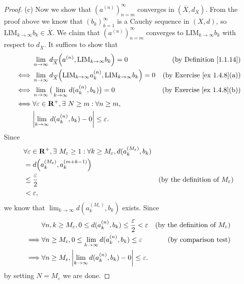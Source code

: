 \begin{proof}{(c)}
    Now we show that \((a^{(n)})_{n = m}^\infty\) converges in \((\overline{X}, d_{\overline{X}})\).
    From the proof above we know that \((b_k)_{k = 1}^\infty\) is a Cauchy sequence in \((X, d)\), so \(\text{LIM}_{k \to \infty} b_k \in \overline{X}\).
    We claim that \((a^{(n)})_{n = m}^\infty\) converges to \(\text{LIM}_{k \to \infty} b_k\) with respect to \(d_{\overline{X}}\).
    It suffices to show that
    \begin{align*}
             & \lim_{n \to \infty} d_{\overline{X}}\Big(a^{(n)}, \text{LIM}_{k \to \infty} b_k\Big) = 0                             & \text{(by Definition \ref{1.1.14})}    \\
        \iff & \lim_{n \to \infty} d_{\overline{X}}\Big(\text{LIM}_{k \to \infty} a_k^{(n)}, \text{LIM}_{k \to \infty} b_k\Big) = 0 & \text{(by Exercise \ref{ex 1.4.8}(a))} \\
        \iff & \lim_{n \to \infty} \big(\lim_{k \to \infty} d(a_k^{(n)}, b_k)\big) = 0                                              & \text{(by Exercise \ref{ex 1.4.8}(b))} \\
        \iff & \forall \varepsilon \in \R^+, \exists\ N \geq m : \forall n \geq m,                                                                                           \\
             & \abs{\lim_{k \to \infty} d(a_k^{(n)}, b_k) - 0} \leq \varepsilon.
    \end{align*}
    Since
    \begin{align*}
         & \forall \varepsilon \in \mathbf{R}^+, \exists\ M_\varepsilon \geq 1 : \forall k \geq M_\varepsilon, d(a_k^{(M_\varepsilon)}, b_k)                                                   \\
         & = d\Big(a_k^{(M_\varepsilon)}, a_k^{(m + k - 1)}\Big)                                                                                                                       \\
         & \leq \frac{\varepsilon}{2}                                                                                                & \text{(by the definition of \(M_\varepsilon\))} \\
         & < \varepsilon,
    \end{align*}
    we know that \(\lim_{k \to \infty} d(a_k^{(M_\varepsilon)}, b_k)\) exists.
    Since
    \begin{align*}
                 & \forall n, k \geq M_\varepsilon, 0 \leq d(a_k^{(n)}, b_k) \leq \frac{\varepsilon}{2} < \varepsilon & \text{(by the definition of \(M_\varepsilon\))} \\
        \implies & \forall n \geq M_\varepsilon, 0 \leq \lim_{k \to \infty} d(a_k^{(n)}, b_k) \leq \varepsilon        & \text{(by comparison test)}                     \\
        \implies & \forall n \geq M_\varepsilon, \left\lvert\lim_{k \to \infty} d(a_k^{(n)}, b_k) - 0\right\rvert \leq \varepsilon.
    \end{align*}
    by setting \(N = M_\varepsilon\) we are done.


\end{proof}
